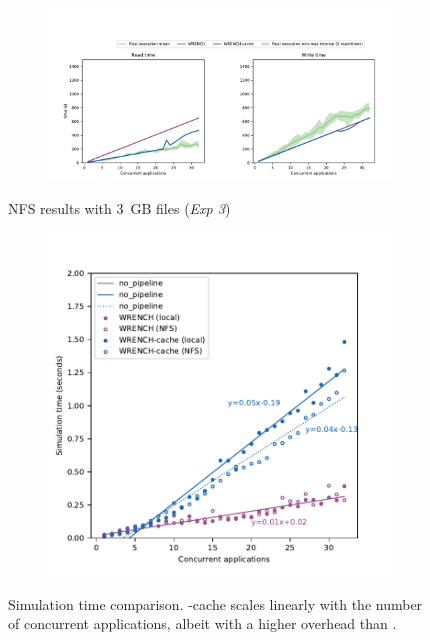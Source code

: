 \begin{figure}
    \begin{subfigure}{\linewidth}
        \centering
        \includegraphics[width=\linewidth]{result/multi/figures/multi_nfs.pdf}
    \end{subfigure}
    \caption{NFS results with 3~GB files (\textit{Exp 3})}
    \label{fig:multi_nfs}
\end{figure}

\begin{figure}
    \begin{subfigure}{\columnwidth}
        \centering
        \includegraphics[width=\linewidth]{result/multi/figures/simulation_time.pdf}
    \end{subfigure}
    \caption{Simulation time comparison. \wrench-cache scales
    linearly with the number of concurrent applications, albeit
    with a higher overhead than \wrench.}
    \label{fig:multi_time}
\end{figure}

